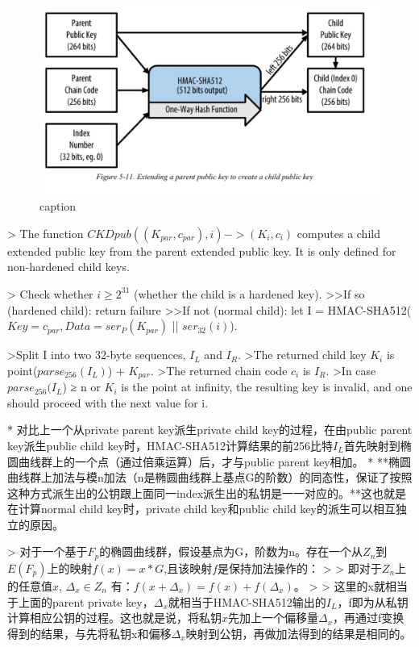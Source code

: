 \begin{figure}[h]
\centering
\includegraphics[width=\textwidth]{./CKDpub.png}
\caption{caption}\label{fig-parsesig}
\end{figure}

> The function $CKDpub((K_{par}, c_{par}), i) -> (K_i, c_i)$ computes a child extended public key from the parent extended public key. It is only defined for non-hardened child keys.

> Check whether $i ≥ 2^{31}$ (whether the child is a hardened key).
>>If so (hardened child): return failure  
>>If not (normal child): let I = HMAC-SHA512($Key = c_{par}, Data = ser_P(K_{par})$ || $ser_{32}(i)$).

>Split I into two 32-byte sequences, $I_L$ and $I_R$.  
>The returned child key $K_i$ is point($parse_{256}(I_L)$) + $K_{par}$.  
>The returned chain code $c_i$ is $I_R$.  
>In case $parse_{256}(I_L$) ≥ n or $K_i$ is the point at infinity, the resulting key is invalid, and one should proceed with the next value for i.

* 对比上一个从private parent key派生private child key的过程，在由public parent key派生public child key时，HMAC-SHA512计算结果的前256比特$I_L$首先映射到椭圆曲线群上的一个点（通过倍乘运算）后，才与public parent key相加。
* **椭圆曲线群上加法与模n加法（n是椭圆曲线群上基点G的阶数）的同态性，保证了按照这种方式派生出的公钥跟上面同一index派生出的私钥是一一对应的。**这也就是在计算normal child key时，private child key和public child key的派生可以相互独立的原因。

> 对于一个基于$F_p$的椭圆曲线群，假设基点为G，阶数为n。存在一个从$Z_n$到$E(F_p)$上的映射$f(x)=x*G$,且该映射$f$是保持加法操作的：
> > 即对于$Z_n$上的任意值$x$, $\Delta_x \in Z_n$ 有：$f(x+\Delta_x)=f(x)+f(\Delta_x)$。   
> 
> 这里的x就相当于上面的parent private key，$\Delta_x$就相当于HMAC-SHA512输出的$I_L$，f即为从私钥计算相应公钥的过程。这也就是说，将私钥$x$先加上一个偏移量$\Delta_x$，再通过f变换得到的结果，与先将私钥x和偏移$\Delta_x$映射到公钥，再做加法得到的结果是相同的。

